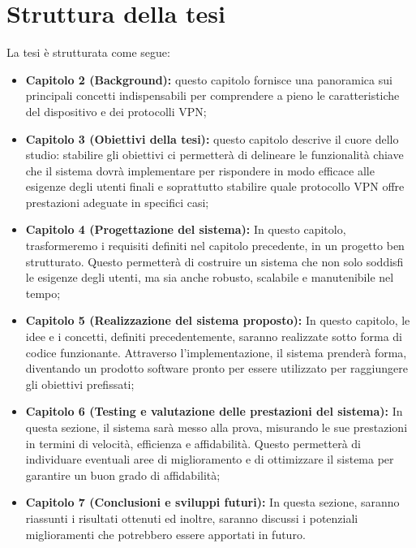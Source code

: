 {\section{Struttura della tesi}
La tesi è strutturata come segue:
\begin{itemize}
    \item \textbf{Capitolo 2 (Background):} questo capitolo fornisce una panoramica sui principali concetti indispensabili per comprendere a pieno le caratteristiche del dispositivo e dei protocolli VPN;
    \item \textbf{Capitolo 3 (Obiettivi della tesi):} questo capitolo descrive il cuore dello studio: stabilire gli obiettivi ci permetterà di delineare le funzionalità chiave che il sistema dovrà implementare per rispondere in modo efficace alle esigenze degli utenti finali e soprattutto stabilire quale protocollo VPN offre prestazioni adeguate in specifici casi;
    \item \textbf{Capitolo 4 (Progettazione del sistema):} In questo capitolo, trasformeremo i requisiti definiti nel capitolo precedente, in un progetto ben strutturato. Questo permetterà di costruire un sistema che non solo soddisfi le esigenze degli utenti, ma sia anche robusto, scalabile e manutenibile nel tempo;
    \item \textbf{Capitolo 5 (Realizzazione del sistema proposto):} In questo capitolo, le idee e i concetti, definiti precedentemente, saranno realizzate sotto forma di codice funzionante. Attraverso l’implementazione, il sistema prenderà forma, diventando un prodotto software pronto per essere utilizzato per raggiungere gli obiettivi prefissati;
    \item \textbf{Capitolo 6 (Testing e valutazione delle prestazioni del sistema):}  In questa sezione, il sistema sarà messo alla prova, misurando le sue prestazioni in termini di velocità, efficienza e affidabilità. Questo permetterà di individuare eventuali aree di miglioramento e di ottimizzare il sistema per garantire un buon grado di affidabilità;
    \item \textbf{Capitolo 7 (Conclusioni e sviluppi futuri):} In questa sezione, saranno riassunti i risultati ottenuti ed inoltre, saranno discussi i potenziali miglioramenti che potrebbero essere apportati in futuro.
\end{itemize}

}